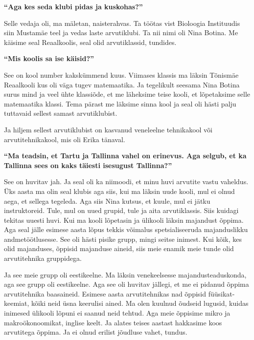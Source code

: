 \textbf{\enquote{Aga kes seda klubi pidas ja kuskohas?}}

Selle vedaja oli, ma mäletan, naisterahvas. Ta töötas vist Bioloogia
Instituudis siin Mustamäe teel ja vedas laste arvutiklubi. Ta nii nimi oli
Nina Botina. Me käisime seal
Reaalkoolis, seal olid arvutiklassid, tundides.

\textbf{\enquote{Mis koolis sa ise käisid?}}

See on kool number kakskümmend kuus. 
Viimases klassis ma läksin Tõnismäe Reaalkooli 
kus oli väga tugev matemaatika. Ja tegelikult seesama Nina Botina surus mind ja 
veel ühte klassiõde, et me läheksime teise kooli, et lõpetaksime selle 
matemaatika klassi. Tema pärast me läksime sinna kool ja seal oli hästi palju  
tuttavaid sellest samast arvutiklubist.

Ja hiljem sellest arvutiklubist on kasvanud veneleelne tehnikakool või 
arvutitehnikakool, mis oli Erika tänaval. 

\textbf{\enquote{Ma teadsin, et Tartu ja Tallinna vahel on erinevus. Aga 
selgub, et ka Tallinna sees on kaks täiesti isesugust Tallinna?}}

See on huvitav jah. Ja seal oli ka niimoodi, et minu huvi arvutite vastu 
vaheldus. Üks aasta ma olin seal klubis aga siis, kui ma läksin uude kooli, mul 
ei olnud aega, et  sellega tegeleda. Aga siis Nina kutsus, et kuule,  mul ei 
jätku instruktoreid. Tule, mul on uued grupid, tule ja aita 
arvutiklassis. Siis kuidagi  tekitas uuesti huvi. Kui ma kooli lõpetasin ja  
ülikooli läksin majandust õppima. Aga seal jälle  esimese aasta lõpus tekkis 
võimalus spetsialiseeruda majanduslikku andmetöötlusesse. See oli hästi pisike 
grupp, mingi seitse inimest. Kui kõik, kes olid majanduses, õppisid majanduse 
aineid, siis meie enamik meie tunde olid  arvutitehnika gruppidega.

Ja see meie grupp oli eestikeelne. Ma läksin venekeelsesse majandusteaduskonda, 
aga see grupp oli eestikeelne. Aga
see oli huvitav jällegi, et me ei pidanud õppima arvutitehnika baasaineid. 
Esimese aasta arvutitehnikas nad õppisid füüsikat-keemiat, kõiki neid üsna 
keerulisi ained. Ma olen kuulnud õudseid lugusid, kuidas inimesed ülikooli 
lõpuni ei saanud neid tehtud. Aga meie õppisime mikro ja makroökonoomikat, 
inglise keelt. Ja alates teises aastast hakkasime koos arvutitega õppima. Ja ei 
olnud erilist jõudluse vahet, tundus.


